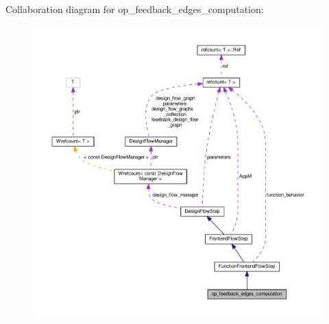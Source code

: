 Collaboration diagram for op\+\_\+feedback\+\_\+edges\+\_\+computation\+:
\nopagebreak
\begin{figure}[H]
\begin{center}
\leavevmode
\includegraphics[width=350pt]{d0/d2a/classop__feedback__edges__computation__coll__graph}
\end{center}
\end{figure}
